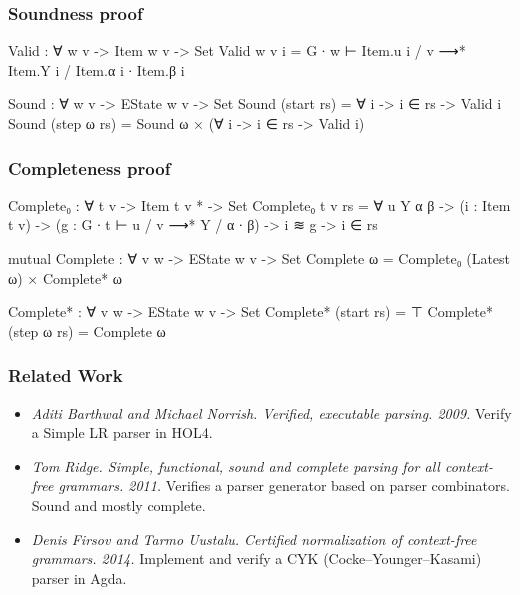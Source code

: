 \begin{frame}
	\frametitle{Soundness proof}
	\begin{itemize}
		
	\end{itemize}
	\begin{code}
		  Valid : ∀ {w v} -> Item w v -> Set
		  Valid {w} {v} i = 
		    G ∙ w ⊢ Item.u i / v ⟶* Item.Y i / Item.α i ∙ Item.β i
		  
		  Sound : ∀ {w v} -> EState w v -> Set
		  Sound (start rs) = ∀ {i} -> i ∈ rs -> Valid i
		  Sound (step ω rs) = Sound ω × (∀ {i} -> i ∈ rs -> Valid i)
  	\end{code}
\end{frame}

\begin{frame}
	\frametitle{Completeness proof}
	\begin{code}
		  Complete₀ : ∀ {t v} -> Item t v * -> Set
		  Complete₀ {t} {v} rs = ∀ {u Y α β} ->
		    (i : Item t v) ->
		    (g : G ∙ t ⊢ u / v ⟶* Y / α ∙ β) ->
		    i ≋ g ->
		    i ∈ rs
		
		  mutual
		    Complete : ∀ {v w} -> EState w v -> Set
		    Complete ω = Complete₀ (Latest ω) × Complete* ω
		  
		    Complete* : ∀ {v w} -> EState w v -> Set
		    Complete* (start rs) = ⊤
		    Complete* (step ω rs) = Complete ω
	\end{code}
\end{frame}

\begin{frame}
	\frametitle{Related Work}
	\begin{itemize}
		\item
		
			\emph{Aditi Barthwal and Michael Norrish. Verified, executable
			parsing. 2009.} Verify a Simple LR parser in HOL4.

		\item

			\emph{Tom Ridge. Simple, functional, sound and complete parsing for
			all context- free grammars. 2011.} Verifies a parser generator 
			based on parser combinators. Sound and mostly complete.

		\item 
		
			\emph{Denis Firsov and Tarmo Uustalu. Certified normalization of
			context-free grammars. 2014.}  Implement and verify a CYK 
			(Cocke–Younger–Kasami) parser in Agda.
		
	\end{itemize}
\end{frame}

